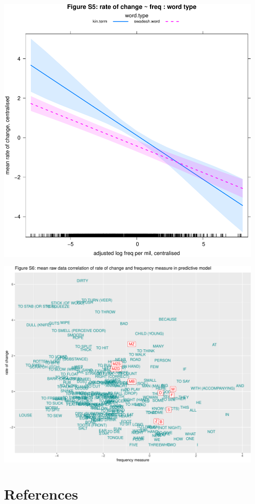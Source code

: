 \documentclass[]{article}
\begin{document}
\includegraphics{figures/unnamed-chunk-13-1.pdf}

\includegraphics{figures/unnamed-chunk-14-1.pdf}

\section*{References}\label{references}
\end{document}
